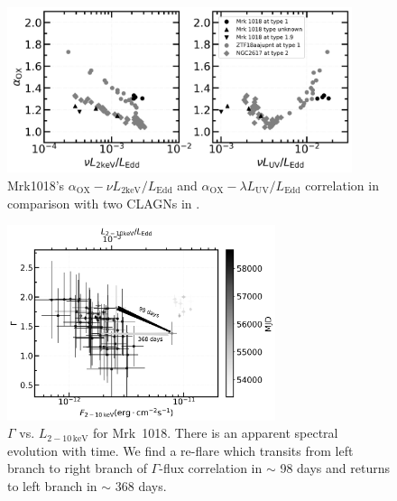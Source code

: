 \documentclass[twocolumn]{aastex63}
\begin{document}
\begin{figure}
\centering
	\includegraphics[width=0.9\textwidth]{./pic/Mrk1018_subplots_plus_2individuals_alpha_ox_L_x_Luv_rate.png}
    \caption{Mrk1018's $\alpha_\mathrm{OX}-\nu L_\mathrm{2keV}/L_\mathrm{Edd}$ and $\alpha_\mathrm{OX}-\lambda L_\mathrm{UV}/L_\mathrm{Edd}$ correlation in comparison with two CLAGNs in \citet{2019arXiv190904676R}.}   
    \label{fig:alpha_ox_lx_luv}
\end{figure}

\begin{figure}
\centering
	\includegraphics[width=0.7\textwidth]{./pic/xrayappendgood-errorbar-f-g-tmap.png}
    \caption{$\Gamma$ vs. $L_\mathrm{2-10\,keV}$ for Mrk~1018. There is an apparent spectral evolution with time. We find a re-flare which transits from left branch to right branch of $\Gamma$-flux correlation in $\sim$ 98 days and returns to left branch in $\sim$ 368 days. }
    \label{fig:xrayappendgood-fandg-tmap}
\end{figure}
\end{document}
